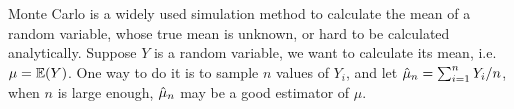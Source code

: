 \documentclass{iitthesis}
\theoremstyle{definition}
\begin{document}
Monte Carlo is a widely used simulation method to calculate the mean of a random variable, whose true mean is unknown, or hard to be calculated analytically. Suppose $Y$ is a random variable, we want to calculate its mean, i.e. $\mu=\mathbb{E}(Y)$. One way to do it is to sample $n$ values of $Y_i$, and let $\hat{\mu}_n =\sum_{i=1}^n Y_i/n$, when $n$ is large enough, $\hat{\mu}_n$ may be a good estimator of $\mu$. 
%
\end{document}
